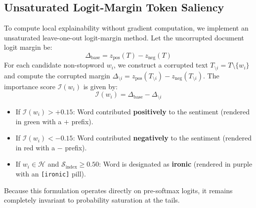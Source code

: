 \documentclass[conference]{IEEEtran}
\begin{document}
\subsection{Unsaturated Logit-Margin Token Saliency}
To compute local explainability without gradient computation, we implement an unsaturated leave-one-out logit-margin method. Let the uncorrupted document logit margin be:
\begin{equation}
\Delta_{\text{base}} = z_{\text{pos}}(T) - z_{\text{neg}}(T)
\end{equation}
For each candidate non-stopword $w_i$, we construct a corrupted text $T_{\setminus i} = T \setminus \{w_i\}$ and compute the corrupted margin $\Delta_{\setminus i} = z_{\text{pos}}(T_{\setminus i}) - z_{\text{neg}}(T_{\setminus i})$. The importance score $\mathcal{I}(w_i)$ is given by:
\begin{equation}
\mathcal{I}(w_i) = \Delta_{\text{base}} - \Delta_{\setminus i}
\end{equation}
\begin{itemize}
    \item If $\mathcal{I}(w_i) > +0.15$: Word contributed \textbf{positively} to the sentiment (rendered in green with a $+$ prefix).
    \item If $\mathcal{I}(w_i) < -0.15$: Word contributed \textbf{negatively} to the sentiment (rendered in red with a $-$ prefix).
    \item If $w_i \in \mathcal{H}$ and $\mathcal{S}_{\text{index}} \ge 0.50$: Word is designated as \textbf{ironic} (rendered in purple with an \texttt{[ironic]} pill).
\end{itemize}
Because this formulation operates directly on pre-softmax logits, it remains completely invariant to probability saturation at the tails.
\end{document}
